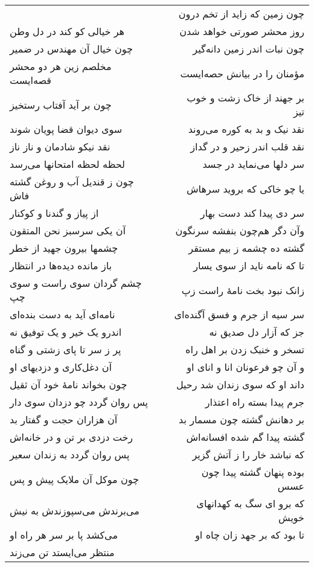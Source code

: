 \begin{center}
\begin{longtable}{l p{0.5cm} r}
&&
چون زمین که زاید از تخم درون
\\
هر خیالی کو کند در دل وطن
&&
روز محشر صورتی خواهد شدن
\\
چون خیال آن مهندس در ضمیر
&&
چون نبات اندر زمین دانه‌گیر
\\
مخلصم زین هر دو محشر قصه‌ایست
&&
مؤمنان را در بیانش حصه‌ایست
\\
چون بر آید آفتاب رستخیز
&&
بر جهند از خاک زشت و خوب تیز
\\
سوی دیوان قضا پویان شوند
&&
نقد نیک و بد به کوره می‌روند
\\
نقد نیکو شادمان و ناز ناز
&&
نقد قلب اندر زحیر و در گداز
\\
لحظه لحظه امتحانها می‌رسد
&&
سر دلها می‌نماید در جسد
\\
چون ز قندیل آب و روغن گشته فاش
&&
یا چو خاکی که بروید سرهاش
\\
از پیاز و گندنا و کوکنار
&&
سر دی پیدا کند دست بهار
\\
آن یکی سرسبز نحن المتقون
&&
وآن دگر هم‌چون بنفشه سرنگون
\\
چشمها بیرون جهید از خطر
&&
گشته ده چشمه ز بیم مستقر
\\
باز مانده دیده‌ها در انتظار
&&
تا که نامه ناید از سوی یسار
\\
چشم گردان سوی راست و سوی چپ
&&
زانک نبود بخت نامهٔ راست زپ
\\
نامه‌ای آید به دست بنده‌ای
&&
سر سیه از جرم و فسق آگنده‌ای
\\
اندرو یک خیر و یک توفیق نه
&&
جز که آزار دل صدیق نه
\\
پر ز سر تا پای زشتی و گناه
&&
تسخر و خنبک زدن بر اهل راه
\\
آن دغل‌کاری و دزدیهای او
&&
و آن چو فرعونان انا و انای او
\\
چون بخواند نامهٔ خود آن ثقیل
&&
داند او که سوی زندان شد رحیل
\\
پس روان گردد چو دزدان سوی دار
&&
جرم پیدا بسته راه اعتذار
\\
آن هزاران حجت و گفتار بد
&&
بر دهانش گشته چون مسمار بد
\\
رخت دزدی بر تن و در خانه‌اش
&&
گشته پیدا گم شده افسانه‌اش
\\
پس روان گردد به زندان سعیر
&&
که نباشد خار را ز آتش گزیر
\\
چون موکل آن ملایک پیش و پس
&&
بوده پنهان گشته پیدا چون عسس
\\
می‌برندش می‌سپوزندش به نیش
&&
که برو ای سگ به کهدانهای خویش
\\
می‌کشد پا بر سر هر راه او
&&
تا بود که بر جهد زان چاه او
\\
منتظر می‌ایستد تن می‌زند
&&

\end{longtable}
\end{center}
